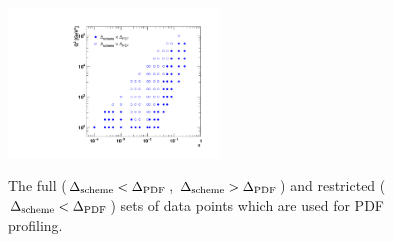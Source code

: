 \documentclass[pdftex,twocolumn,epjc3]{svjour3}          %
\begin{document}
\begin{figure}
  \centering
  {{\includegraphics[width=0.5\textwidth]{pics/pseudodata.pdf}}}
  \caption{The full ($\Delta_{\rm scheme} < \Delta_{\rm PDF}$, $\Delta_{\rm scheme} > \Delta_{\rm PDF}$) and restricted ($\Delta_{\rm scheme} < \Delta_{\rm PDF}$) sets of data points which are used for PDF profiling.}
  \label{fig:data}
\end{figure}
\end{document}
